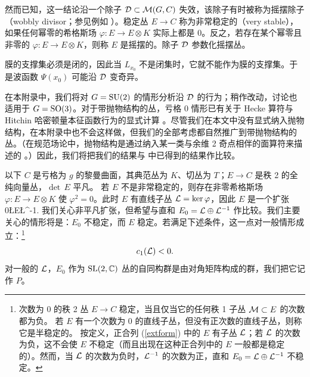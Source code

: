 然而已知，这一结论沿一个除子 ${\mathcal D}\subset {\mathcal M}(G,C)$ 失效，该除子有时被称为摇摆除子（wobbly divisor；参见例如 \cite{DP,PP,PPN,HZ}）。稳定丛 $E\to C$ 称为非常稳定的（very stable），如果任何幂零的希格斯场 $\varphi:E\to E\otimes K$ 实际上都是 0。反之，若存在某个幂零且非零的 $\varphi:E\to E\otimes K$，则称 $E$ 是摇摆的。除子 ${\mathcal D}$ 参数化摇摆丛。
 
膜的支撑集必须是闭的，因此当 $L_{x_0}$ 不是闭集时，它就不能作为膜的支撑集。于是波函数 $\Psi(x_0)$ 可能沿 ${\mathcal D}$ 变奇异。
 
在本附录中，我们将对 $G={\mathrm{SU}}(2)$ 的情形分析沿 ${\mathcal D}$ 的行为；稍作改动，讨论也适用于 $G={\mathrm{SO}}(3)$。对于带抛物结构的丛，亏格 0 情形已有关于 Hecke 算符与 Hitchin 哈密顿量本征函数行为的显式计算 \cite{EFK3}。尽管我们在本文中没有显式纳入抛物结构，在本附录中也不会这样做，但我们的全部考虑都自然推广到带抛物结构的丛。（在规范场论中，抛物结构是通过纳入某一类与余维 2 奇点相伴的面算符来描述的 \cite{GuW2}。）因此，我们将把我们的结果与 \cite{EFK3} 中已得到的结果作比较。
 
以下 $C$ 是亏格为 $g$ 的黎曼曲面，其典范丛为 $K$、切丛为 $T$；$E\to C$ 是秩 2 的全纯向量丛，$\det\,E$ 平凡。
若 $E$ 不是非常稳定的，则存在非零希格斯场 $\varphi:E\to E\otimes K$ 使 $\varphi^2=0$。此时 $E$ 有直线子丛 ${\mathcal L}=\mathrm{ker}\,\varphi$，因此 $E$ 是一个扩张
\be\label{extform} 0\to \L \to  E\to \L^{-1}.\ee
我们关心非平凡扩张，但希望与直和 $E_0={\mathcal L}\oplus {\mathcal L}^{-1}$ 作比较。我们主要关心的情形将是：$E_0$ 不稳定，而 $E$ 稳定。若满足下述条件，这一点对一般情形成立：\footnote{次数为 0 的秩 2 丛 $E\to C$ 稳定，当且仅当它的任何秩 1 子丛 ${\mathcal M}\subset E$ 的次数都为负。
若 $E$ 有一个次数为 0 的直线子丛，但没有正次数的直线子丛，则称它是半稳定的。
按定义，正合列 (\ref{extform}) 中的 $E$ 有子丛 ${\mathcal L}$；若 ${\mathcal L}$ 的次数为负，这不会使 $E$ 不稳定（而且出现在这种正合列中的 $E$ 一般都是稳定的）。然而，当 ${\mathcal L}$ 的次数为负时，${\mathcal L}^{-1}$ 的次数为正，直和 $E_0={\mathcal L}\oplus {\mathcal L}^{-1}$ 不稳定。}
$$c_1({\mathcal L})<0. $$
对一般的 ${\mathcal L}$，$E_0$ 作为 ${\mathrm{SL}}(2,{\mathbb C})$ 丛的自同构群是由对角矩阵构成的群，我们把它记作 $P$。

